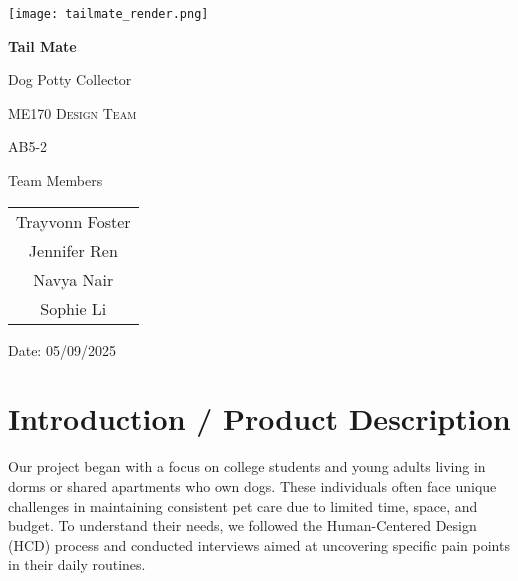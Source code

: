 \documentclass[12pt]{article}
\title{}
\theoremstyle{definition} %
\theoremstyle{plain} %
\begin{document}
\begin{titlepage}
  \centering
  \vspace*{-3cm}                                   %
  \texttt{[image: tailmate\_render.png]}\par
  \vspace{1cm}

  {\Huge\bfseries Tail Mate\par}
  \vspace{0.4cm}
  {\Large Dog Potty Collector\par}

  \vfill                                            %

  {\large\scshape ME170 Design Team\par}
  \vspace{0.2cm}
  {\large AB5-2\par}

  \vspace{0.8cm}

  {\Large Team Members\par}
  \vspace{0.3cm}
  \begin{tabular}{c}
    Trayvonn Foster\\
    Jennifer Ren\\
    Navya Nair\\
    Sophie Li
  \end{tabular}

  \vfill

  {\large Date: 05/09/2025\par}
\end{titlepage}

\tableofcontents
\pagebreak
\section{Introduction / Product Description}
\vspace{.5cm}
Our project began with a focus on college students and young adults living in dorms
or shared apartments who own dogs. These individuals often face unique challenges
in maintaining consistent pet care due to limited time, space, and budget. To
understand their needs, we followed the Human-Centered Design (HCD) process
and conducted interviews aimed at uncovering specific pain points in their daily
routines.
\end{document}
